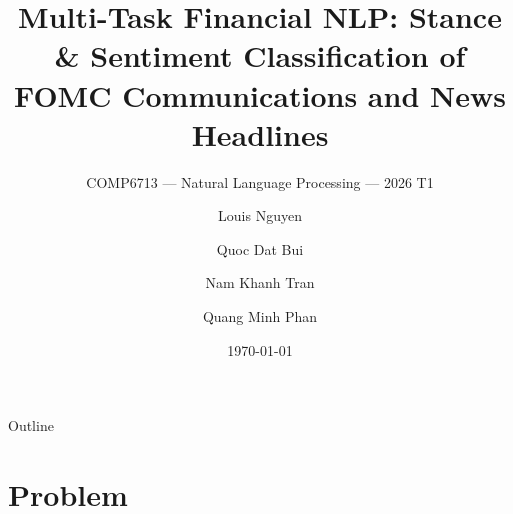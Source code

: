 \documentclass[10pt, aspectratio=169]{beamer}
\title{Multi-Task Financial NLP: Stance \& Sentiment Classification of FOMC Communications and News Headlines}
\subtitle{COMP6713 --- Natural Language Processing --- 2026 T1}
\author{Louis Nguyen \and Quoc Dat Bui \and Nam Khanh Tran \and Quang Minh Phan}
\institute{UNSW School of Computer Science and Engineering}
\date{\today}
\begin{document}
\maketitle

\begin{frame}{Outline}
    \tableofcontents
\end{frame}

\section{Problem}

\end{document}
